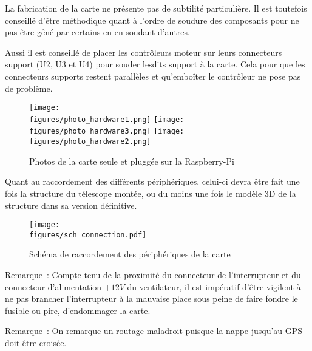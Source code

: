 La fabrication de la carte ne présente pas de subtilité particulière. Il est toutefois conseillé d'être méthodique quant à l'ordre de soudure des composants pour ne pas être gêné par certains en en soudant d'autres.

Aussi il est conseillé de placer les contrôleurs moteur sur leurs connecteurs support (U2, U3 et U4) pour souder lesdits support à la carte. Cela pour que les connecteurs supports restent parallèles et qu'emboîter le contrôleur ne pose pas de problème.

\begin{figure}[H]
    \centering
	\texttt{[image: \\figures/photo\_hardware1.png]}
	\texttt{[image: \\figures/photo\_hardware3.png]}
	\texttt{[image: \\figures/photo\_hardware2.png]}
    \decoRule
    \caption[
    Photos de la carte seule et pluggée sur la Raspberry-Pi]{
    Photos de la carte seule et pluggée sur la Raspberry-Pi}
    \label{fig:Photos de la carte seule et pluggée sur la Raspberry-Pi}
	\end{figure}

\vspace{1cm}

Quant au raccordement des différents périphériques, celui-ci devra être fait une fois la structure du télescope montée, ou du moins une fois le modèle 3D de la structure dans sa version définitive.

\begin{figure}[H]
    \centering
	\texttt{[image: \\figures/sch\_connection.pdf]}
    \decoRule
    \caption[
    Schéma de raccordement des périphériques de la carte]{
    Schéma de raccordement des périphériques de la carte}
    \label{fig:Schéma de raccordement des périphériques de la carte}
	\end{figure}


\vspace{1cm}

Remarque~: Compte tenu de la proximité du connecteur de l'interrupteur  et du connecteur d'alimentation $+12V$ du ventilateur, il est impératif d'être vigilent à ne pas brancher l'interrupteur à la mauvaise place sous peine de faire fondre le fusible ou pire, d'endommager la carte.

\vspace{1cm}

Remarque~: On remarque un routage maladroit puisque la nappe jusqu'au GPS doit être croisée.

